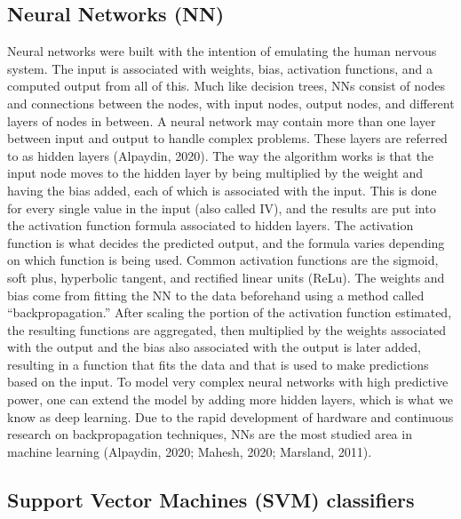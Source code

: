\documentclass[
  jou]{apa6}
\begin{document}
\hypertarget{neural-networks-nn}{%
\subsection{Neural Networks (NN)}\label{neural-networks-nn}}

Neural networks were built with the intention of emulating the human nervous system. The input is associated with weights, bias, activation functions, and a computed output from all of this. Much like decision trees, NNs consist of nodes and connections between the nodes, with input nodes, output nodes, and different layers of nodes in between. A neural network may contain more than one layer between input and output to handle complex problems. These layers are referred to as hidden layers (Alpaydin, 2020).
The way the algorithm works is that the input node moves to the hidden layer by being multiplied by the weight and having the bias added, each of which is associated with the input. This is done for every single value in the input (also called IV), and the results are put into the activation function formula associated to hidden layers. The activation function is what decides the predicted output, and the formula varies depending on which function is being used. Common activation functions are the sigmoid, soft plus, hyperbolic tangent, and rectified linear units (ReLu). The weights and bias come from fitting the NN to the data beforehand using a method called ``backpropagation.'' After scaling the portion of the activation function estimated, the resulting functions are aggregated, then multiplied by the weights associated with the output and the bias also associated with the output is later added, resulting in a function that fits the data and that is used to make predictions based on the input.
To model very complex neural networks with high predictive power, one can extend the model by adding more hidden layers, which is what we know as deep learning. Due to the rapid development of hardware and continuous research on backpropagation techniques, NNs are the most studied area in machine learning (Alpaydin, 2020; Mahesh, 2020; Marsland, 2011).

\hypertarget{support-vector-machines-svm-classifiers}{%
\subsection{Support Vector Machines (SVM) classifiers}\label{support-vector-machines-svm-classifiers}}
\end{document}
